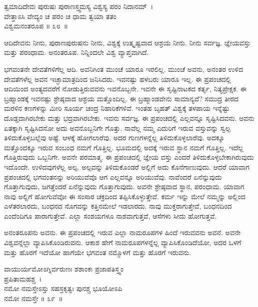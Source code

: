 \begin{shloka}
ತ್ವಮಾದಿದೇವಃ ಪುರುಷಃ ಪುರಾಣಸ್ತ್ವಮಸ್ಯ ವಿಶ್ವಸ್ಯ ಪರಂ ನಿದಾನಮ್~।\\ವೇತ್ತಾಽಸಿ ವೇದ್ಯಂ ಚ ಪರಂ ಚ ಧಾಮ ತ್ವಯಾ ತತಂ\\ವಿಶ್ವಮನಂತರೂಪ \hfill॥ ೩೮~॥
\end{shloka}

\begin{artha}
ಆದಿದೇವನು ನೀನು, ಪುರಾಣಪುರುಷನು ನೀನು, ವಿಶ್ವಕ್ಕೆ ಉತ್ಕೃಷ್ಟವಾದ ಆಶ್ರಯ ನೀನು. ನೀನು ಸರ್ವಜ್ಞ. ಜ್ಞೇಯವಸ್ತು ಮತ್ತು ಪರಂಧಾಮ. ಅನಂತರೂಪ. ನಿನ್ನಿಂದಲೇ ವಿಶ್ವ ವ್ಯಾಪ್ತವಾಗಿದೆ.
\end{artha}

ಭಗವಂತನೇ ದೇವತೆಗಳಿಗೆಲ್ಲ ಆದಿ. ಅವನಿಗಿಂತ ಮುಂಚೆ ಯಾರೂ ಇರಲಿಲ್ಲ. ಮುಂಚೆ ಅವನು, ಅನಂತರ ಉಳಿದ ದೇವತೆಗಳೆಲ್ಲ ಅವನ ಇಚ್ಛಾಮಾತ್ರದಿಂದ ಜನಿಸಿದರು. ಇವನಷ್ಟು ಹಳಬರು ಯಾರೂ ಇಲ್ಲ. ಈ ಪ್ರಪಂಚದಲ್ಲಿ ಆದಿಯಿಂದ ಅಂತ್ಯದವರೆಗೆ ನೋಡುತ್ತಿರುವವನು ಇವನೊಬ್ಬನೇ. ಇವನೇ ಈ ಸೃಷ್ಟಿನಾಟಕದ ಕರ್ತೃ, ನಿತ್ಯಪ್ರೇಕ್ಷಕ. ಈ ಬ್ರಹ್ಮಾಂಡಕ್ಕೆ ಇವನಷ್ಟು ಶ್ರೇಷ್ಠವಾದ ಆಶ್ರಯ ಮತ್ತೊಂದಿಲ್ಲ. ಈ ಬ್ರಹ್ಮಾಂಡವೇನು ಸಾಮಾನ್ಯವೆ? ಸಮುದ್ರ ತೀರದ ಮರಳಿನ ಕಣಗಳನ್ನು ಮೀರಿ ಸೂರ್ಯ ಚಂದ್ರ ನಿಹಾರಿಕೆಗಳಿವೆ. ಇಂತಹ ಬೃಹತ್ ವಿಶ್ವಕ್ಕೆ ತಳಪಾಯ ಇನ್ನೆಷ್ಟು ದೊಡ್ಡದಾಗಿರಬೇಕು ಮತ್ತು ಭದ್ರವಾಗಿರಬೇಕು. ಇವನು ಸರ್ವಜ್ಞ. ಈ ಪ್ರಪಂಚದಲ್ಲಿ ಎಲ್ಲವನ್ನೂ ಸೃಷ್ಟಿಸಿದವನು. ಅವನು ಏತಕ್ಕಾಗಿ ಸೃಷ್ಟಿಸಿದನೋ ಅದು ಅವನೊಬ್ಬನಿಗೇ ಗೊತ್ತು. ನಾವೆಲ್ಲ ನಮ್ಮ ಎದುರಿಗೆ ಇರುವ ವಸ್ತುವನ್ನು ಸ್ವಲ್ಪ ತಿಳಿದುಕೊಳ್ಳಬಲ್ಲೆವು ಅಷ್ಟೆ. ಆಳಕ್ಕೆ ಹೋಗಲಾರೆವು. ಅದರ ಗುಣಗಳನ್ನೆಲ್ಲ ತಿಳಿದುಕೊಳ್ಳಲಾರೆವು. ಅದಕ್ಕೂ ಮತ್ತೊಂದಕ್ಕೂ ಇರುವ ಸಂಬಂಧ ನಮಗೆ ಗೊತ್ತಿಲ್ಲ. ಭೂಮದಲ್ಲಿ ಅದಕ್ಕೆ ಇರುವ ಸ್ಥಾನ ನಮಗೆ ಗೊತ್ತಿಲ್ಲ. ಇದೆಲ್ಲ ಗೊತ್ತಿರುವುದು ಒಬ್ಬನಿಗೇ. ಅವನೇ ಪರಮಾತ್ಮ. ಈ ಪ್ರಪಂಚದಲ್ಲಿ ಜ್ಞೇಯ ವಸ್ತು ಎಂದರೆ ತಿಳಿದುಕೊಳ್ಳಬೇಕಾಗಿರುವುದು ಇದೊಂದೇ. ಉಳಿದವುಗಳೆಲ್ಲ ಅಲ್ಪ. ಅಲ್ಪವನ್ನು ತಿಳಿದುಕೊಂಡರೆ ಅಲ್ಲಿಗೆ ಅದು ಕೊನೆಗಾಣುವುದು. ಆದರೆ ಯಾವಾಗ ಪ್ರಪಂಚದಲ್ಲಿ ಭಗವಂತನನ್ನು ಅರಿಯುವೆವೊ ಆಗ ಎಲ್ಲವನ್ನೂ ಅರಿಯುವೆವು. ನಾವೆಂದರೆ ಏನೆನ್ನುವುದು ಗೊತ್ತಾಗುವುದು, ಜಗತ್ತೆಂದರೆ ಏನೆನ್ನುವುದು ಗೊತ್ತಾಗುವುದು. ಅವನೇ ಶ್ರೇಷ್ಠವಾದ ಸ್ಥಾನ, ಪರಂಧಾಮ. ಯಾವಾಗ ನಾವು ಅಲ್ಲಿಗೆ ಹೋಗುವೆವೋ ಈ ಸಂಸಾರ ಚಕ್ರದಿಂದ ತಪ್ಪಿಸಿಕೊಳ್ಳುತ್ತೇವೆ. ಕರ್ಮ ಇನ್ನು ಮೇಲೆ ನಮ್ಮನ್ನು ಅಲ್ಲಿಂದ ಎಳೆತರಲಾರದು, ಬಂಧನದ ನೊಗವನ್ನು ಕತ್ತಿನಮೇಲೆ ಇಡಲಾರದು. ನಾವು ಮುಕ್ತರಾಗುತ್ತೇವೆ, ಬಂಧನದಿಂದ ಎಂದೆಂದಿಗೂ ಪಾರಾಗುತ್ತೇವೆ. ಎಲ್ಲಾ ಸಂಶಯಗಳೂ ನಾಶವಾಗುತ್ತವೆ, ಆಸೆಗಳು ಸೀದು ಹೋಗುತ್ತವೆ.

ಅನಂತರೂಪನು ಅವನು. ಈ ಪ್ರಪಂಚದಲ್ಲಿ ಇರುವ ಎಲ್ಲಾ ನಾಮರೂಪಗಳ ಹಿಂದೆ ಇರುವವನು ಅವನೆ. ಅವನೇ ವಿಶ್ವವನ್ನೆಲ್ಲಾ ವ್ಯಾಪಿಸಿಕೊಂಡಿರುವನು. ಆಕಾಶ ಹೇಗೆ ನಾಮರೂಪಗಳನ್ನೆಲ್ಲ ವ್ಯಾಪಿಸಿಕೊಂಡಿದೆಯೋ, ಅದರ ಒಳಗೆ ಮತ್ತು ಹೊರಗೆ ಇದೆಯೋ ಹಾಗೆಯೇ ಭಗವಂತ ನಮ್ಮೊಳಗೆ ಮತ್ತು ಹೊರಗೆ ಇರುವನು.

\begin{shloka}
ವಾಯುರ್ಯಮೋಽಗ್ನಿರ್ವರುಣಃ ಶಶಾಂಕಃ ಪ್ರಜಾಪತಿಸ್ತ್ವಂ\\ ಪ್ರಪಿತಾಮಹಶ್ಚ~।\\ನಮೋ ನಮಸ್ತೇಽಸ್ತು ಸಹಸ್ರಕೃತ್ವಃ ಪುನಶ್ಚ ಭೂಯೋಽಪಿ\\ ನಮೋ ನಮಸ್ತೇ \hfill॥ ೩೯~॥
\end{shloka}


